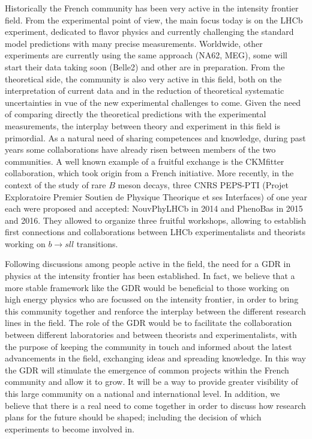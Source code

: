 Historically the French community has been very active in the intensity frontier field. From the experimental point of view, the main focus today is on the  LHCb experiment, dedicated to flavor physics and currently challenging the standard model predictions with many precise measurements. Worldwide, other experiments are currently using the same approach (NA62, MEG), some will start their data taking soon (Belle2) and other are in preparation. From the theoretical side, the community is also very active in this field, both on the interpretation of current data and in the reduction of theoretical systematic uncertainties in vue of the new experimental challenges to come.  Given the need of comparing directly  the theoretical predictions with the experimental measurements, the interplay between theory and experiment in this field is primordial. As a natural need of sharing competences and knowledge, during past years some collaborations have already risen between members of the two communities. A well known example of a fruitful exchange is the CKMfitter collaboration, which took origin from a French initiative. More recently, in the context of the study of rare $B$ meson decays, three  CNRS PEPS-PTI (Projet Exploratoire Premier Soutien de Physique Theorique et ses Interfaces) of one year each were proposed and accepted:  NouvPhyLHCb in 2014 and PhenoBas in 2015 and 2016. They allowed to organize three fruitful workshops,  allowing to establish first connections and collaborations between LHCb experimentalists and theorists  working on $b \to sll$ transitions. 

Following discussions among people active in the field, the need for a GDR in physics at the intensity frontier has been established. In fact, we believe that a more stable framework like the GDR would be beneficial to those working on high energy physics who are focussed on the intensity frontier, in order to bring this community together and renforce the interplay between the different research lines in the field. The role of the GDR would be to 
facilitate the collaboration between different laboratories and between theorists and experimentalists, with the purpose of keeping the community in touch and informed about the latest advancements in the field, exchanging ideas and spreading knowledge. In this way the GDR will stimulate the emergence of common projects within the French community and  allow it to grow. It will be a way to provide greater visibility of this large community on a national and international level. In addition, we believe that there is a real need to come together in order to discuss how research plans for the future should be shaped; including the decision of which experiments to become involved in.


